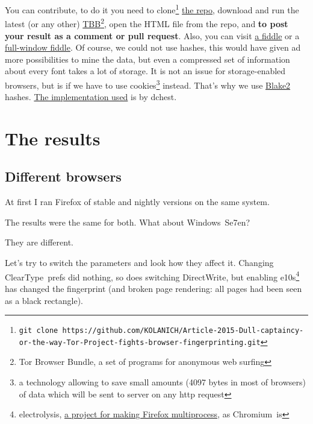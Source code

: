 \documentclass[letterpaper,14pt]{article}
\begin{document}
You can contribute, to do it you need to clone\footnote{\lstinline!git clone https://github.com/KOLANICH/Article-2015-Dull-captaincy-or-the-way-Tor-Project-fights-browser-fingerprinting.git!} \href{https://github.com/KOLANICH/Article-2015-Dull-captaincy-or-the-way-Tor-Project-fights-browser-fingerprinting}{the repo}, download and run the latest (or any other) \href{https://www.torproject.org/download/download.html.en}{TBB}\footnote{Tor Browser Bundle, a set of programs for anonymous web surfing}, open the HTML file from the repo, and \textbf{to post your result as a comment or pull request}. Also, you can visit \href{http://jsfiddle.net/fyw4qmdg/5/}{a fiddle} or a \href{http://fiddle.jshell.net/fyw4qmdg/5/show/}{full-window fiddle}. Of course, we could not use hashes, this would have given ad more possibilities to mine the data, but even a compressed set of information about every font takes a lot of storage. It is not an issue for storage-enabled browsers, but is if we have to use cookies\footnote{a technology allowing to save small amounts (4097 bytes in most of browsers) of data which will be sent to server on any http request} instead. That's why we use \href{https://en.wikipedia.org/wiki/BLAKE_%28hash_function%29}{Blake2} hashes. \href{https://github.com/dchest/blake2s-js}{The implementation used} is by dchest.

\section{The results}\label{the-results}

\subsection{Different browsers}\label{different-browsers}

At first I ran Firefox of stable and nightly versions on the same system.



The results were the same for both. What about Windows\texttrademark\ Se7en?



They are different.

Let's try to switch the parameters and look how they affect it. Changing ClearType\texttrademark\ prefs did nothing, so does switching DirectWrite, but enabling e10s\footnote{electrolysis, \href{https://wiki.mozilla.org/Electrolysis}{a project for making Firefox multiprocess}, as Chromium\texttrademark\ is} has changed the fingerprint (and broken page rendering: all pages had been seen as a black rectangle).
\end{document}
